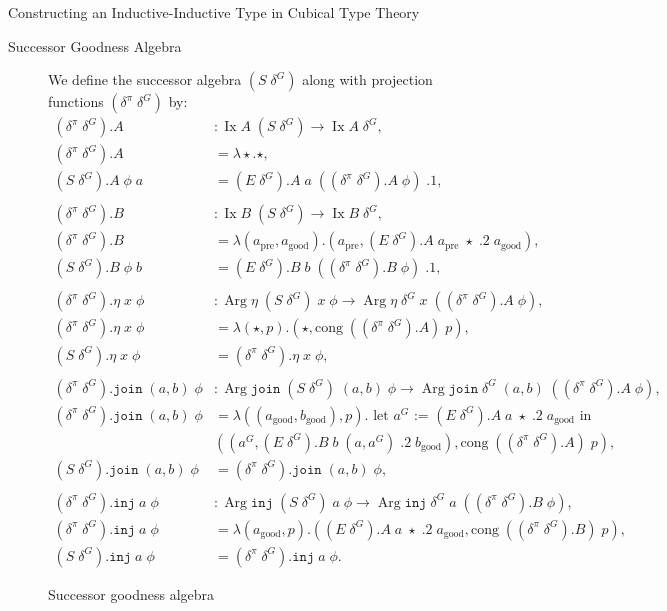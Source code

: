 \documentclass[runningheads]{llncs}
\DeclareMathOperator{\Arg}{Arg}
\DeclareMathOperator{\Ix}{Ix}
\newcommand{\pre}[1]{{#1}_\text{pre}}
\newcommand{\good}[1]{{#1}_\text{good}}
\newcommand{\join}{\texttt{join}}
\newcommand{\inj}{\texttt{inj}}
\begin{document}
\begin{section}{Constructing an Inductive-Inductive Type in Cubical Type Theory}
\begin{subsection}{Successor Goodness Algebra}
\begin{figure}[htpb]
\begin{flushleft}
We define the successor algebra $(S\;\delta^G)$ along with projection functions $(\delta^\pi\;\delta^G)$ by:
\begin{align*}
(\delta^\pi\;\delta^G).A &: \Ix A\;(S\;\delta^G) \to \Ix A\;\delta^G,\\
(\delta^\pi\;\delta^G).A &= \lambda \star. \star,\\
(S\;\delta^G).A\;\phi\;a &= (E\;\delta^G).A\;a\;((\delta^\pi\;\delta^G).A\;\phi)\;.1,\\
\\[-.15in]
(\delta^\pi\;\delta^G).B &: \Ix B\;(S\;\delta^G) \to \Ix B\;\delta^G,\\
(\delta^\pi\;\delta^G).B &= \lambda (\pre{a}, \good{a}). (\pre{a}, (E\;\delta^G).A\;\pre{a}\;\star\;.2\;\good{a}),\\
(S\;\delta^G).B\;\phi\;b &= (E\;\delta^G).B\;b\;((\delta^\pi\;\delta^G).B\;\phi)\;.1,\\
\\[-.15in]
(\delta^\pi\;\delta^G).\eta\;x\;\phi &: \Arg\eta\;(S\;\delta^G)\;x\;\phi \to \Arg\eta\;\delta^G\;x\;((\delta^\pi\;\delta^G).A\;\phi),\\
(\delta^\pi\;\delta^G).\eta\;x\;\phi &= \lambda(\star, p).(\star, \text{cong}\;((\delta^\pi\;\delta^G).A)\;p),\\
(S\;\delta^G).\eta\;x\;\phi &= (\delta^\pi\;\delta^G).\eta\;x\;\phi,\\
\\[-.15in]
(\delta^\pi\;\delta^G).\join\;(a, b)\;\phi &: \Arg\join\;(S\;\delta^G)\; (a, b)\;\phi \to \Arg\join\;\delta^G\;(a, b)\;((\delta^\pi\;\delta^G).A\;\phi),\\
(\delta^\pi\;\delta^G).\join\;(a, b)\;\phi &= \lambda((\good{a}, \good{b}), p).\text{ let $a^G$ := $(E\;\delta^G).A\;a\;\star\;.2\;\good{a}$ in}\\& ((a^G, (E\;\delta^G).B\;b\;(a, a^G)\;.2\;\good{b}), \text{cong}\;((\delta^\pi\;\delta^G).A)\;p),\\
(S\;\delta^G).\join\;(a, b)\;\phi &= (\delta^\pi\;\delta^G).\join\;(a, b)\;\phi,\\
\\[-.15in]
(\delta^\pi\;\delta^G).\inj\;a\;\phi &: \Arg\inj\;(S\;\delta^G)\;a\;\phi \to \Arg\inj\;\delta^G\;a\;((\delta^\pi\;\delta^G).B\;\phi),\\
(\delta^\pi\;\delta^G).\inj\;a\;\phi &= \lambda(\good{a}, p). ((E\;\delta^G).A\;a\;\star\;.2\;\good{a}, \text{cong}\;((\delta^\pi\;\delta^G).B)\;p),\\
(S\;\delta^G).\inj\;a\;\phi &= (\delta^\pi\;\delta^G).\inj\;a\;\phi.
\end{align*}
\end{flushleft}
\caption{\label{example-successor-algebra-def}Successor goodness algebra}
\end{figure}


\end{subsection}
\end{section}
\end{document}
